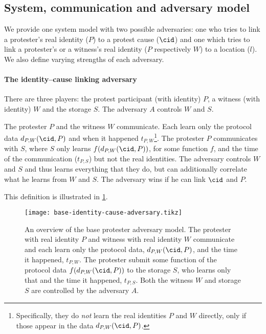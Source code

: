 \subsection{System, communication and adversary model}%
\label{adversary-model}

We provide one system model with two possible adversaries: one who tries to 
link a protester's real identity (\(P\)) to a protest cause (\(\cid\)) and one 
which tries to link a protester's or a witness's real identity (\(P\) 
respectively \(W\)) to a location (\(l\)).
We also define varying strengths of each adversary.

\paragraph{The identity--cause linking adversary}

There are three players: the protest participant (with identity) \(P\), a 
witness (with identity) \(W\) and the storage \(S\).
The adversary \(A\) controls \(W\) and \(S\).

\begin{definition}%
  \label{base-identity-cause-adversary}
  The protester \(P\) and the witness \(W\) communicate.
  Each learn only the protocol data \(d_{P,W}(\cid, P)\) and when it happened 
  \(t_{P,W}\)\footnote{%
    Specifically, they do \emph{not} learn the real identities \(P\) and \(W\) 
    directly, only if those appear in the data \(d_{P,W}(\cid, P)\).
  }.
  The protester \(P\) communicates with \(S\), where \(S\) only learns 
  \(f(d_{P,W}(\cid, P))\), for some function \(f\), and the time of the 
  communication (\(t_{P,S}\)) but not the real identities.
  The adversary controls \(W\) and \(S\) and thus learns everything that they 
  do, but can additionally correlate what he learns from \(W\) and \(S\).
  The adversary wins if he can link \(\cid\) and \(P\).
\end{definition}

This definition is illustrated in \cref{fig:identity-cause-adversary}.

\begin{figure}
  \centering
  \texttt{[image: base-identity-cause-adversary.tikz]}
  \caption{\label{fig:identity-cause-adversary}%
    An overview of the base protester adversary model.
    The protester with real identity \(P\) and witness with real identity \(W\) 
    communicate and each learn only the protocol data, \(d_{P,W}(\cid, P)\), 
    and the time it happened, \(t_{P,W}\).
    The protester submit some function of the protocol data \(f(d_{P,W}(\cid, 
      P))\) to the storage \(S\), who learns only that and the time it 
    happened, \(t_{P,S}\).
    Both the witness \(W\) and storage \(S\) are controlled by the adversary 
    \(A\).
  }
\end{figure}

